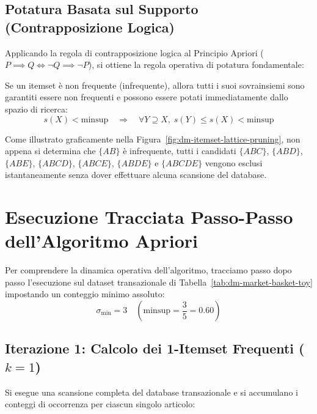 \FloatBarrier
\subsection{Potatura Basata sul Supporto (Contrapposizione Logica)}
Applicando la regola di contrapposizione logica al Principio Apriori ($P \implies Q \iff \neg Q \implies \neg P$), si ottiene la regola operativa di potatura fondamentale:

\begin{corollary}
Se un itemset è non frequente (infrequente), allora tutti i suoi sovrainsiemi sono garantiti essere non frequenti e possono essere potati immediatamente dallo spazio di ricerca:
\begin{equation}
\label{eq:dm-apriori-pruning-rule}
s(X) < \mathrm{minsup} \quad \Longrightarrow \quad \forall Y \supseteq X, \; s(Y) \le s(X) < \mathrm{minsup}
\end{equation}
\end{corollary}

Come illustrato graficamente nella Figura~\ref{fig:dm-itemset-lattice-pruning}, non appena si determina che $\{AB\}$ è infrequente, tutti i candidati $\{ABC\}$, $\{ABD\}$, $\{ABE\}$, $\{ABCD\}$, $\{ABCE\}$, $\{ABDE\}$ e $\{ABCDE\}$ vengono esclusi istantaneamente senza dover effettuare alcuna scansione del database.

\FloatBarrier
\section{Esecuzione Tracciata Passo-Passo dell'Algoritmo Apriori}
\label{sec:dm-apriori-step-by-step}

Per comprendere la dinamica operativa dell'algoritmo, tracciamo passo dopo passo l'esecuzione sul dataset transazionale di Tabella~\ref{tab:dm-market-basket-toy} impostando un conteggio minimo assoluto:
\begin{equation}
\sigma_{\min} = 3 \quad \left(\mathrm{minsup} = \frac{3}{5} = 0.60\right)
\end{equation}

\FloatBarrier
\subsection{Iterazione 1: Calcolo dei 1-Itemset Frequenti ($k=1$)}
Si esegue una scansione completa del database transazionale e si accumulano i conteggi di occorrenza per ciascun singolo articolo:

